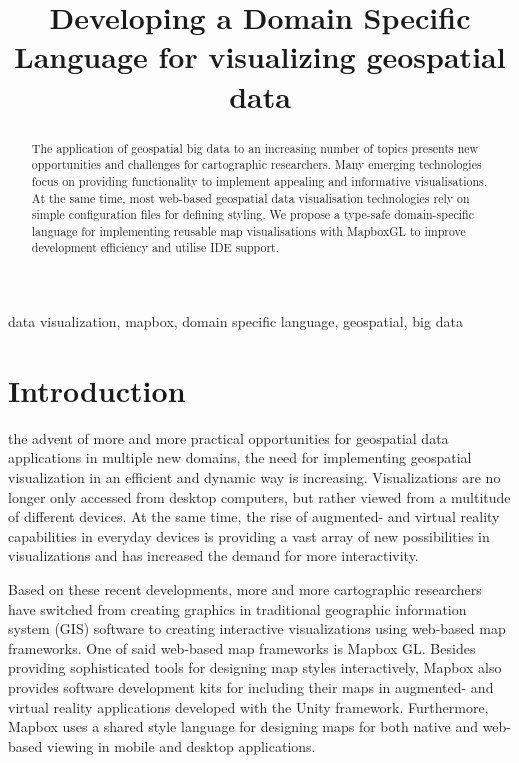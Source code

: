 \documentclass[conference]{IEEEtran}
\begin{document}
\title{Developing a Domain Specific Language for visualizing geospatial data}

\author{
\and
{}
}

\maketitle

\begin{abstract}
The application of geospatial big data to an increasing number of topics presents new opportunities and challenges for cartographic researchers. Many emerging technologies focus on providing functionality to implement appealing and informative visualisations. At the same time, most web-based geospatial data visualisation technologies rely on simple configuration files for defining styling. We propose a type-safe domain-specific language for implementing reusable map visualisations with MapboxGL to improve development efficiency and utilise IDE support.
\end{abstract}

\begin{IEEEkeywords}
data visualization, mapbox, domain specific language, geospatial, big data
\end{IEEEkeywords}

\section{Introduction}
 the advent of more and more practical opportunities for geospatial data applications in multiple new domains, the need for implementing geospatial visualization in an efficient and dynamic way is increasing. Visualizations are no longer only accessed from desktop computers, but rather viewed from a multitude of different devices. 
At the same time, the rise of augmented- and virtual reality capabilities in everyday devices is providing a vast array of new possibilities in visualizations and has increased the demand for more interactivity. 

Based on these recent developments, more and more cartographic researchers have switched from creating graphics in traditional geographic information system (GIS) software to creating interactive visualizations using web-based map frameworks. 
One of said web-based map frameworks is Mapbox GL. Besides providing sophisticated tools for designing map styles interactively\cite{dunn2017custom}, Mapbox also provides software development kits for including their maps in augmented- and virtual reality applications developed with the Unity framework.
Furthermore, Mapbox uses a shared style language for designing maps for both native and web-based viewing in mobile and desktop applications.
\end{document}
